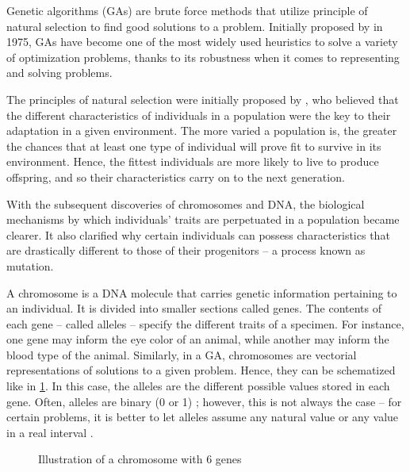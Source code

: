 Genetic algorithms (GAs) are brute force methods that utilize principle of natural selection to find good solutions to a problem. Initially proposed by \textcite{HOLLAND1992} in 1975, GAs have become one of the most widely used heuristics to solve a variety of optimization problems, thanks to its robustness when it comes to representing and solving problems.

The principles of natural selection were initially proposed by \textcite{DARWIN1859}, who believed that the different characteristics of individuals in a population were the key to their adaptation in a given environment. The more varied a population is, the greater the chances that at least one type of individual will prove fit to survive in its environment. Hence, the fittest individuals are more likely to live to produce offspring, and so their characteristics carry on to the next generation.

With the subsequent discoveries of chromosomes and DNA, the biological mechanisms by which individuals' traits are perpetuated in a population became clearer. It also clarified why certain individuals can possess characteristics that are drastically different to those of their progenitors -- a process known as mutation.

A chromosome is a DNA molecule that carries genetic information pertaining to an individual. It is divided into smaller sections called genes. The contents of each gene -- called alleles -- specify the different traits of a specimen. For instance, one gene may inform the eye color of an animal, while another may inform the blood type of the animal. Similarly, in a GA, chromosomes are vectorial representations of solutions to a given problem. Hence, they can be schematized like in \cref{fig:chromosome}. In this case, the alleles are the different possible values stored in each gene. Often, alleles are binary (0 or 1) \cite{KATOCH2021}; however, this is not always the case -- for certain problems, it is better to let alleles assume any natural value \cite{HERMAWANTO2013} or any value in a real interval \cite{GONÇALVES2011}.

\begin{figure}[ht]
    \centering
    \caption{Illustration of a chromosome with 6 genes}
    \label{fig:chromosome}
\end{figure}

